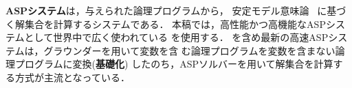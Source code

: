 \textbf{ASPシステム}は，与えられた論理プログラムから，
安定モデル意味論~\cite{Gelfond88:iclp}
に基づく解集合を計算するシステムである．
本稿では，高性能かつ高機能なASPシステムとして世界中で広く使われている
{\clingo}%
を使用する．
{\clingo}を含め最新の高速ASPシステムは，グラウンダーを用いて変数を含
む論理プログラムを変数を含まない論理プログラムに変換(\textbf{基礎化})
したのち，ASPソルバーを用いて解集合を計算する方式が主流となっている．

%




